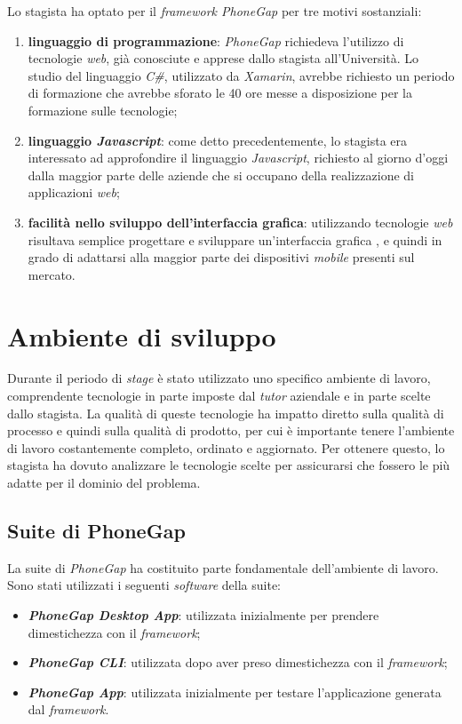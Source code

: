 Lo stagista ha optato per il \textit{framework PhoneGap} per tre motivi sostanziali:
\begin{enumerate}
	\item \textbf{linguaggio di programmazione}: \textit{PhoneGap} richiedeva l'utilizzo di tecnologie \textit{web}, già conosciute e apprese dallo stagista all'Università. Lo studio del linguaggio \textit{C\#}, utilizzato da \textit{Xamarin}, avrebbe richiesto un periodo di formazione che avrebbe sforato le 40 ore messe a disposizione per la formazione sulle tecnologie;
	\item \textbf{linguaggio \textit{Javascript}}: come detto precedentemente, lo stagista era interessato ad approfondire il linguaggio \textit{Javascript}, richiesto al giorno d'oggi dalla maggior parte delle aziende che si occupano della realizzazione di applicazioni \textit{web};
	\item \textbf{facilità nello sviluppo dell'interfaccia grafica}: utilizzando tecnologie \textit{web} risultava semplice progettare e sviluppare un'interfaccia grafica , e quindi in grado di adattarsi alla maggior parte dei dispositivi \textit{mobile} presenti sul mercato.
\end{enumerate}

\section{Ambiente di sviluppo}

Durante il periodo di \textit{stage} è stato utilizzato uno specifico ambiente di lavoro, comprendente tecnologie in parte imposte dal \textit{tutor} aziendale e in parte scelte dallo stagista. La qualità di queste tecnologie ha impatto diretto sulla qualità di processo e quindi sulla qualità di prodotto, per cui è importante tenere l'ambiente di lavoro costantemente completo, ordinato e aggiornato. Per ottenere questo, lo stagista ha dovuto analizzare le tecnologie scelte per assicurarsi che fossero le più adatte per il dominio del problema.

\subsection{Suite di PhoneGap}

La suite di \textit{PhoneGap} ha costituito parte fondamentale dell'ambiente di lavoro. Sono stati utilizzati i seguenti \textit{software} della suite:
\begin{itemize}
	\item \textbf{\textit{PhoneGap Desktop App}}: utilizzata inizialmente per prendere dimestichezza con il \textit{framework};
	\item \textbf{\textit{PhoneGap CLI}}: utilizzata dopo aver preso dimestichezza con il \textit{framework};
	\item \textbf{\textit{PhoneGap App}}: utilizzata inizialmente per testare l'applicazione generata dal \textit{framework}.
\end{itemize}

